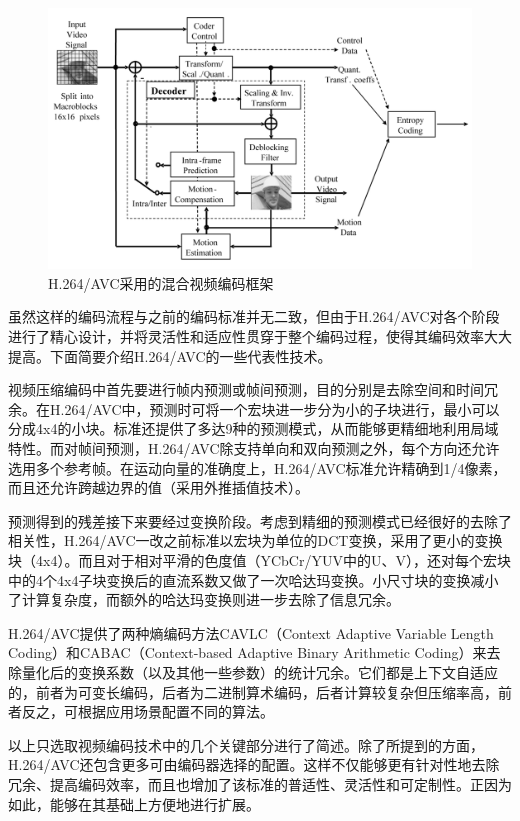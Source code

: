 \begin{figure}[h]
	\centering
	\includegraphics[width = 1.0\linewidth]{figures/hybrid-coding.png}
	\caption{H.264/AVC采用的混合视频编码框架\label{fig:hybrid-coding}}
\end{figure}

虽然这样的编码流程与之前的编码标准并无二致，但由于H.264/AVC对各个阶段进行了精心设计，并将灵活性和适应性贯穿于整个编码过程，使得其编码效率大大提高。下面简要介绍H.264/AVC的一些代表性技术。

视频压缩编码中首先要进行帧内预测或帧间预测，目的分别是去除空间和时间冗余。在H.264/AVC中，预测时可将一个宏块进一步分为小的子块进行，最小可以分成4x4的小块。标准还提供了多达9种的预测模式，从而能够更精细地利用局域特性。而对帧间预测，H.264/AVC除支持单向和双向预测之外，每个方向还允许选用多个参考帧。在运动向量的准确度上，H.264/AVC标准允许精确到1/4像素，而且还允许跨越边界的值（采用外推插值技术）。

预测得到的残差接下来要经过变换阶段。考虑到精细的预测模式已经很好的去除了相关性，H.264/AVC一改之前标准以宏块为单位的DCT变换，采用了更小的变换块（4x4）。而且对于相对平滑的色度值（YCbCr/YUV中的U、V），还对每个宏块中的4个4x4子块变换后的直流系数又做了一次哈达玛变换。小尺寸块的变换减小了计算复杂度，而额外的哈达玛变换则进一步去除了信息冗余。

H.264/AVC提供了两种熵编码方法CAVLC（Context Adaptive Variable Length Coding）和CABAC（Context-based Adaptive Binary Arithmetic Coding）来去除量化后的变换系数（以及其他一些参数）的统计冗余。它们都是上下文自适应的，前者为可变长编码，后者为二进制算术编码，后者计算较复杂但压缩率高，前者反之，可根据应用场景配置不同的算法。

以上只选取视频编码技术中的几个关键部分进行了简述。除了所提到的方面，
H.264/AVC还包含更多可由编码器选择的配置。这样不仅能够更有针对性地去除冗余、提高编码效率，而且也增加了该标准的普适性、灵活性和可定制性。正因为如此，能够在其基础上方便地进行扩展。

